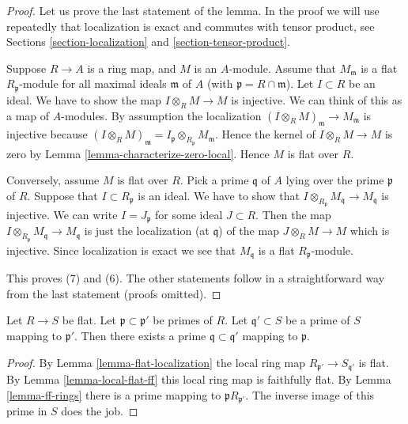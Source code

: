 \begin{proof}
Let us prove the last statement of the lemma.
In the proof we will use repeatedly that localization is exact
and commutes with tensor product, see Sections \ref{section-localization}
and \ref{section-tensor-product}.

\medskip\noindent
Suppose $R \to A$ is a ring map, and $M$ is an $A$-module.
Assume that $M_{\mathfrak m}$ is a flat $R_{\mathfrak p}$-module
for all maximal ideals $\mathfrak m$ of $A$ (with
$\mathfrak p = R \cap \mathfrak m$). Let $I \subset R$ be an ideal.
We have to show the map $I \otimes_R M \to M$ is injective.
We can think of this as a map of $A$-modules.
By assumption the localization
$(I \otimes_R M)_{\mathfrak m} \to M_{\mathfrak m}$ is injective
because
$(I \otimes_R M)_{\mathfrak m} =
I_{\mathfrak p} \otimes_{R_{\mathfrak p}} M_{\mathfrak m}$.
Hence the kernel of $I \otimes_R M \to M$ is zero by
Lemma \ref{lemma-characterize-zero-local}.
Hence $M$ is flat over $R$.

\medskip\noindent
Conversely, assume $M$ is flat over $R$. Pick a prime $\mathfrak q$
of $A$ lying over the prime $\mathfrak p$ of $R$. Suppose that
$I \subset R_{\mathfrak p}$ is an ideal. We have to show that
$I \otimes_{R_{\mathfrak p}} M_{\mathfrak q} \to M_{\mathfrak q}$
is injective. We can write $I = J_{\mathfrak p}$ for some
ideal $J \subset R$. Then the map
$I \otimes_{R_{\mathfrak p}} M_{\mathfrak q} \to M_{\mathfrak q}$
is just the localization (at $\mathfrak q$) of the map
$J \otimes_R M \to M$ which is injective. Since localization is exact
we see that $M_{\mathfrak q}$ is a flat $R_{\mathfrak p}$-module.

\medskip\noindent
This proves (7) and (6). The other statements follow in a straightforward
way from the last statement (proofs omitted).
\end{proof}

\begin{lemma}
\label{lemma-flat-going-down}
Let $R \to S$ be flat. Let $\mathfrak p \subset \mathfrak p'$
be primes of $R$. Let $\mathfrak q' \subset S$ be a prime of $S$
mapping to $\mathfrak p'$. Then there exists a prime
$\mathfrak q \subset \mathfrak q'$ mapping to $\mathfrak p$.
\end{lemma}

\begin{proof}
By Lemma \ref{lemma-flat-localization} the local ring map
$R_{\mathfrak p'} \to S_{\mathfrak q'}$ is flat.
By Lemma \ref{lemma-local-flat-ff} this local ring map is faithfully
flat. By Lemma \ref{lemma-ff-rings} there is a prime mapping to
$\mathfrak p R_{\mathfrak p'}$. The inverse image of this
prime in $S$ does the job.
\end{proof}

